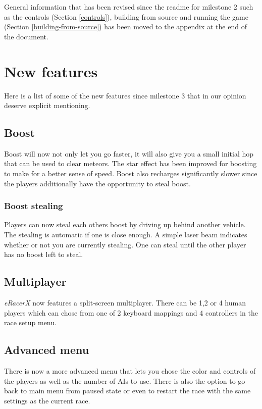 \documentclass[11pt]{article}
\begin{document}
General information that has been revised since the readme for milestone 2 such as the controls (Section \ref{controls}), building from source and running  the game (Section \ref{building-from-source}) has been moved to the appendix at the end of the document. 


\section{New features}
\label{new-features}

Here is a list of some of the new features since milestone 3 that in our opinion deserve explicit mentioning.

\subsection{Boost}

Boost will now not only let you go faster, it will also give you a small initial hop that can be used to clear meteors. The star effect has been improved for boosting to make for a better sense of speed. Boost also recharges significantly slower since the players additionally have the opportunity to steal boost.

\subsubsection{Boost stealing}

Players can now steal each others boost by driving up behind another vehicle. The stealing is automatic if one is close enough. A simple laser beam indicates whether or not you are currently stealing. One can steal until the other player has no boost left to steal.



\subsection{Multiplayer}

\emph{eRacerX} now features a split-screen multiplayer. There can be 1,2 or 4 human players which can chose from one of 2 keyboard mappings and 4 controllers in the race setup menu. 

\subsection{Advanced menu}

There is now a more advanced menu that lets you chose the color and controls of the players as well as the number of AIs to use. There is also the option to go back to main menu from paused state or even to restart the race with the same settings as the current race.
\end{document}
